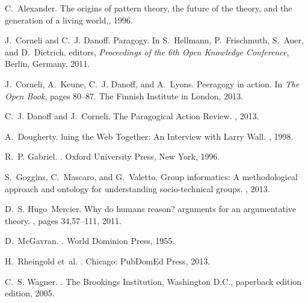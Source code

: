 \documentclass{acm_proc_article-sp}
\begin{document}
\begin{thebibliography}{10}

C.~Alexander.
\newblock The origins of pattern theory, the future of the theory, and the
  generation of a living world,, 1996.

J.~Corneli and C.~J. Danoff.
\newblock Paragogy.
\newblock In S.~Hellmann, P.~Frischmuth, S.~Auer, and D.~Dietrich, editors,
  {\em Proceedings of the 6th Open Knowledge Conference}, Berlin, Germany,
  2011.

J.~Corneli, A.~Keune, C.~J. Danoff, and A.~Lyons.
\newblock Peeragogy in action.
\newblock In {\em The Open Book}, pages 80--87. The Finnish Institute in
  London, 2013.

C.~J. Danoff and J.~Corneli.
\newblock The {P}aragogical {A}ction {R}eview.
, 2013.

A.~Dougherty.
luing the {W}eb {T}ogether: {A}n {I}nterview with {L}arry {W}all.
, 1998.

R.~P. Gabriel.
.
\newblock Oxford University Press, New York, 1996.

S.~Goggins, C.~Mascaro, and G.~Valetto.
\newblock Group informatics: A methodological approach and ontology for
  understanding socio-technical groups.
, 2013.

D.~S. Hugo~Mercier.
\newblock Why do humans reason? arguments for an argumentative theory.
, pages 34,57--111, 2011.

D.~McGavran.
.
\newblock World Dominion Press, 1955.

H.~Rheingold et~al.
.
\newblock Chicago: PubDomEd Press, 2013.

C.~S. Wagner.
.
\newblock The Brookings Institution, Washington D.C., paperback edition
  edition, 2005.

\end{thebibliography}

\balancecolumns
\end{document}
